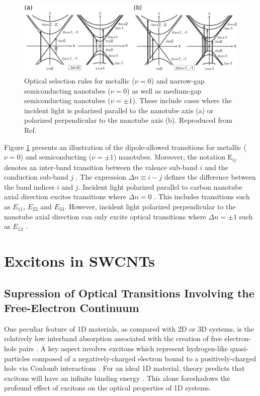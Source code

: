 \begin{figure}[ht]
	\centering
	\includegraphics[scale= 0.52]{images/chapter_optical_props/selection_rules_combined}
	\caption{Optical selection rules for metallic ($\nu = 0 $) and narrow-gap semiconducting nanotubes ($\nu = 0 $) as well as medium-gap semiconducting nanotubes ($\nu = \pm 1$). These include cases where the incident light is polarized parallel to the nanotube axis (a) or polarized perpendicular to the nanotube axis (b). Reproduced from Ref.\ \cite{ando2005theory}}
	\label{fig:allowed_optical_transitions}
\end{figure}

Figure \ref{fig:allowed_optical_transitions} presents an illustration of the dipole-allowed transitions for metallic ($\nu = 0$) and semiconducting ($\nu=\pm 1$) nanotubes. Moreover, the notation E$_{ij}$ denotes an inter-band transition between the valence sub-band $i$ and the conduction sub-band $j$ \cite{weismanKonoBook}. The expression $\Delta n \equiv i - j$ defines the difference between the band indices $i$ and $j$. Incident light polarized parallel to carbon nanotube axial direction excites transitions where $\Delta n = 0$ \cite{weismanKonoBook}. This includes transitions such as $E_{11}$, $E_{22}$ and $E_{33}$. However, incident light polarized perpendicular to the nanotube axial direction can only excite optical transitions where $\Delta n = \pm 1$ such as $E_{12}$ \cite{weismanKonoBook}.


\section{Excitons in SWCNTs}

\subsection{Supression of Optical Transitions Involving the Free-Electron Continuum}

One peculiar feature of 1D materials, as compared with 2D or 3D systems, is the relatively low interband absorption associated with the creation of free electron-hole pairs \cite{ogawa1991interband}. A key aspect involves excitons which represent hydrogen-like quasi-particles composed of a negatively-charged electron bound to a positively-charged hole via Coulomb interactions \cite{Ashcroft, kira2011semiconductor}. For an ideal 1D material, theory predicts that excitons will have an infinite binding energy \cite{loudon1959one, elliott1959theory}. This alone foreshadows the profound effect of excitons on the optical properties of 1D systems.


